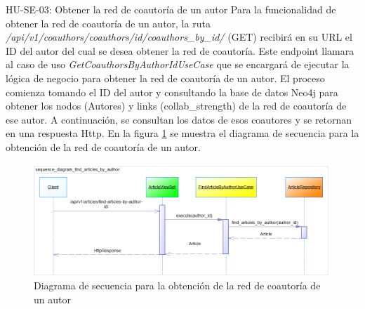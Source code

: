 
HU-SE-03: Obtener la red de coautoría de un autor
Para la funcionalidad de obtener la red de coautoría de un autor, la ruta \textit{/api/v1/coauthors/coauthors/{id}/coauthors\_by\_id/} (GET) recibirá en su URL el ID del autor del cual se desea obtener la red de coautoría.
Este endpoint llamara al caso de uso \textit{GetCoauthorsByAuthorIdUseCase} que se encargará de ejecutar la lógica de negocio para obtener la red de coautoría de un autor.
El proceso comienza tomando el ID del autor y consultando la base de datos Neo4j para obtener los nodos (Autores) y links (collab\_strength) de la red de coautoría de ese autor. A continuación, se consultan los datos de esos coautores y se retornan en una respuesta Http.
En la figura \ref{fig:sequence-diagram-get-coauthors-by-author-id} se muestra el diagrama de secuencia para la obtención de la red de coautoría de un autor.
\begin{figure}[H]
    \centering
    \includegraphics[scale=0.7]{../02Figures/02Chapter/Sprints/Sprint-4/sequence_diagram_find_articles_by_author.png}
    \caption{Diagrama de secuencia para la obtención de la red de coautoría de un autor}
    \label{fig:sequence-diagram-get-coauthors-by-author-id}
\end{figure}

